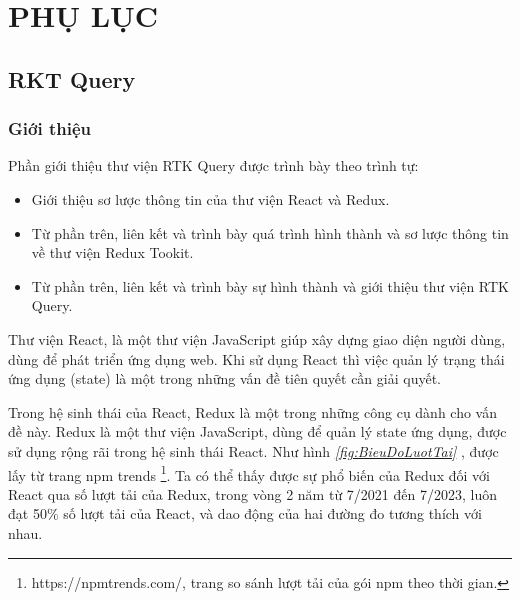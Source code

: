 \chapter{PHỤ LỤC}

\section{RKT Query} \label{sec:RTKQ}

\subsection{Giới thiệu}

\tab Phần giới thiệu thư viện RTK Query được trình bày theo trình tự:

\begin{itemize}
      \item Giới thiệu sơ lược thông tin của thư viện React và Redux.
      \item Từ phần trên, liên kết và trình bày quá trình hình thành và sơ lược thông tin về thư viện Redux Tookit.
      \item Từ phần trên, liên kết và trình bày sự hình thành và giới thiệu thư viện RTK Query.
\end{itemize}

\tab \tab Thư viện React, là một thư viện JavaScript giúp xây dựng giao diện người dùng, dùng để phát triển ứng dụng web.
Khi sử dụng React thì việc quản lý trạng thái ứng dụng (state) là một trong những vấn đề tiên quyết cần giải quyết.

Trong hệ sinh thái của React, Redux là một trong những công cụ dành cho vấn đề này.
Redux là một thư viện JavaScript, dùng để quản lý state ứng dụng, được sử dụng rộng rãi trong hệ sinh thái React.
Như hình \textit{\ref{fig:BieuDoLuotTai} }, được lấy từ trang npm trends \footnote{https://npmtrends.com/, trang so sánh lượt tải của gói npm theo thời gian.}.
Ta có thể thấy được sự phổ biến của Redux đối với React qua số lượt tải của Redux, trong vòng 2 năm từ 7/2021 đến 7/2023, luôn đạt 50\% số lượt tải của React, và dao động của hai đường đo tương thích với nhau.

